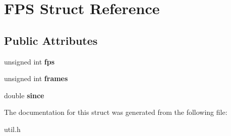 \hypertarget{structFPS}{}\section{F\+PS Struct Reference}
\label{structFPS}
\subsection*{Public Attributes}
\begin{DoxyCompactItemize}
\item 
\mbox{\label{structFPS_ac960f6d060a8c1b0aa94b51ac695a75d}} 
unsigned int {\bfseries fps}
\item 
\mbox{\label{structFPS_acc427eae0a41ee5d36a4c9bdb5149393}} 
unsigned int {\bfseries frames}
\item 
\mbox{\label{structFPS_a00ae9e9c14b85585e20122a32e35000d}} 
double {\bfseries since}
\end{DoxyCompactItemize}


The documentation for this struct was generated from the following file\+:\begin{DoxyCompactItemize}
\item 
util.\+h\end{DoxyCompactItemize}
